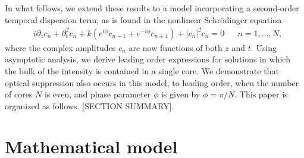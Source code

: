 \documentclass[11pt,reqno]{amsart}
\begin{document}
In what follows, we extend these results to a model incorporating a second-order temporal dispersion term, as is found in the nonlinear Schr\"odinger equation
\begin{align}\label{eq:cnz}
&i\partial_z c_n + \partial_t^2 c_n + k\left(e^{i\phi}c_{n-1}+e^{-i\phi}c_{n+1}\right)+|c_n|^2 c_n = 0 && n = 1, \dots, N,
\end{align}
where the complex amplitudes $c_n$ are now functions of both $z$ and $t$. Using asymptotic analysis, we derive leading order expressions for solutions in which the bulk of the intensity is contained in a single core. We demonstrate that optical suppression also occurs in this model, to leading order, when the number of cores $N$ is even, and phase parameter $\phi$ is given by $\phi=\pi/N$. This paper is organized as follows. [SECTION SUMMARY].


\section{Mathematical model}\label{sec:model}
\end{document}
